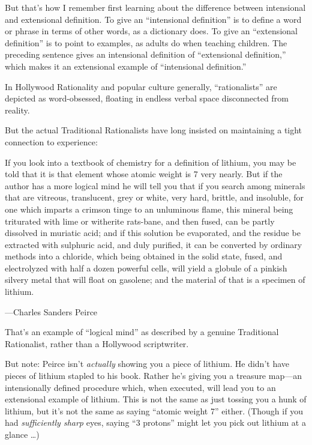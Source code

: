 {
 But that's how I remember first learning about the
difference between intensional and extensional definition. To give an
``intensional definition'' is to
define a word or phrase in terms of other words, as a dictionary does.
To give an ``extensional
definition'' is to point to examples, as adults do
when teaching children. The preceding sentence gives an intensional
definition of ``extensional
definition,'' which makes it an extensional example
of ``intensional definition.''}

{
 In Hollywood Rationality and popular culture generally,
``rationalists'' are depicted as
word-obsessed, floating in endless verbal space disconnected from
reality.}

{
 But the actual Traditional Rationalists have long insisted on
maintaining a tight connection to experience:}

{
 If you look into a textbook of chemistry for a definition of
lithium, you may be told that it is that element whose atomic weight is
7 very nearly. But if the author has a more logical mind he will tell
you that if you search among minerals that are vitreous, translucent,
grey or white, very hard, brittle, and insoluble, for one which imparts
a crimson tinge to an unluminous flame, this mineral being triturated
with lime or witherite rats-bane, and then fused, can be partly
dissolved in muriatic acid; and if this solution be evaporated, and the
residue be extracted with sulphuric acid, and duly purified, it can be
converted by ordinary methods into a chloride, which being obtained in
the solid state, fused, and electrolyzed with half a dozen powerful
cells, will yield a globule of a pinkish silvery metal that will float
on gasolene; and the material of that is a specimen of lithium.}

{\raggedleft
 {}---Charles Sanders Peirce
\par}


\bigskip

{
 That's an example of ``logical
mind'' as described by a genuine Traditional
Rationalist, rather than a Hollywood scriptwriter.}

{
 But note: Peirce isn't \textit{actually} showing
you a piece of lithium. He didn't have pieces of
lithium stapled to his book. Rather he's giving you a
treasure map---an intensionally defined procedure which, when executed,
will lead you to an extensional example of lithium. This is not the
same as just tossing you a hunk of lithium, but it's
not the same as saying ``atomic weight
7'' either. (Though if you had \textit{sufficiently
sharp} eyes, saying ``3 protons''
might let you pick out lithium at a glance \ldots)}

